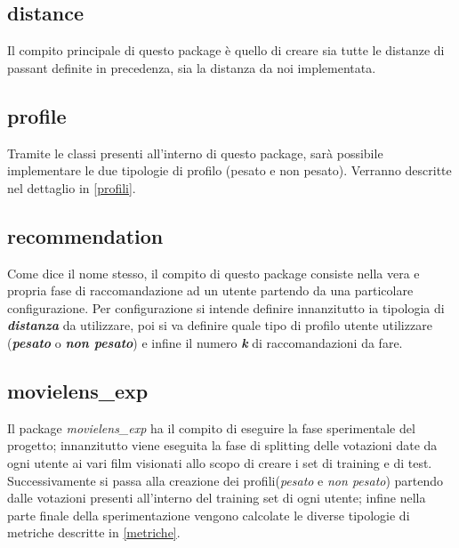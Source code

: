 \subsection{distance}
Il compito principale di questo package è quello di creare sia tutte le distanze di passant definite in precedenza, sia la distanza da noi implementata.
\subsection{profile}
Tramite le classi presenti all'interno di questo package, sarà possibile implementare le due tipologie di profilo (pesato e non pesato). Verranno descritte nel dettaglio in \ref{profili}.
\subsection{recommendation}
Come dice il nome stesso, il compito di questo package consiste nella vera e propria fase di raccomandazione ad un utente partendo da una particolare configurazione. Per configurazione si intende definire innanzitutto ia tipologia di \emph{\textbf{distanza}} da utilizzare, poi si va definire quale tipo di profilo utente utilizzare (\emph{\textbf{pesato}} o \emph{\textbf{non pesato}}) e infine il numero \emph{\textbf{k}} di raccomandazioni da fare.
\subsection{movielens\_exp}
Il package \emph{movielens\_exp} ha il compito di eseguire la fase sperimentale del progetto; innanzitutto viene eseguita la fase di splitting delle votazioni date da ogni utente ai vari film visionati allo scopo di creare i set di training e di test. Successivamente si passa alla creazione dei profili(\emph{pesato} e \emph{non pesato}) partendo dalle votazioni presenti all'interno del training set di ogni utente; infine nella parte finale della sperimentazione vengono calcolate le diverse tipologie di metriche descritte in \ref{metriche}.

